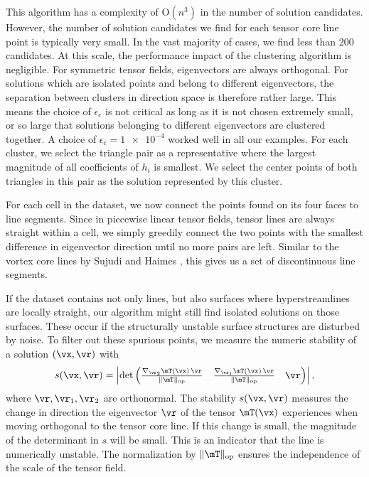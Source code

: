 %
This algorithm has a complexity of $\mathrm{O}(n^3)$ in the number of solution
candidates.
%
However, the number of solution candidates we find for each tensor core line
point is typically very small.
%
In the vast majority of cases, we find less than 200 candidates.
%
At this scale, the performance impact of the clustering algorithm is negligible.
%
For symmetric tensor fields, eigenvectors are always orthogonal.
%
For solutions which are isolated points and belong to different eigenvectors,
the separation between clusters in direction space is therefore rather large.
%
This means the choice of $\epsilon_{\mathrm{c}}$ is not critical as long as
it is not chosen extremely small, or so large that solutions belonging to
different eigenvectors are clustered together.
%
A choice of $\epsilon_{\mathrm{c}} = \num{1e-4}$ worked well in all our
examples.
%
For each cluster, we select the triangle pair as a representative where the
largest magnitude of all coefficients of $h_i$ is smallest.
%
We select the center points of both triangles in this pair as the solution
represented by this cluster.
%

%
For each cell in the dataset, we now connect the points found on its four faces
to line segments.
%
Since in piecewise linear tensor fields, tensor lines are always straight within
a cell, we simply greedily connect the two points with the smallest difference
in eigenvector direction until no more pairs are left.
%
Similar to the vortex core lines by Sujudi and Haimes \cite{Sujudi1995}, this
gives us a set of discontinuous line segments.
%

%
If the dataset contains not only lines, but also surfaces where hyperstreamlines
are locally straight, our algorithm might still find isolated solutions on those
surfaces.
%
These occur if the structurally unstable surface structures are disturbed by
noise.
%
To filter out these spurious points, we measure the numeric stability of
a solution $(\vx, \vr)$ with
%
\begin{equation}
  s(\vx, \vr) = \left|\det
      \begin{pmatrix}
          \frac{\nabla_{\vr_2}\mT(\vx)\,\vr}{\|\mT\|_{\mathrm{op}}} &
          \frac{\nabla_{\vr_1}\mT(\vx)\,\vr}{\|\mT\|_{\mathrm{op}}} &
          \vr
      \end{pmatrix}\right| \text{,}
\end{equation}
%
where $\vr, \vr_1, \vr_2$ are orthonormal.
%
The stability $s(\vx, \vr)$ measures the change in direction the eigenvector
$\vr$ of the tensor $\mT(\vx)$ experiences when moving orthogonal to the tensor
core line.
%
If this change is small, the magnitude of the determinant in $s$ will be small.
%
This is an indicator that the line is numerically unstable.
%
The normalization by $\|\mT\|_{\mathrm{op}}$ ensures the independence of the
scale of the tensor field.
%

